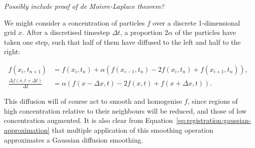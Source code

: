 	  \emph{Possibly include proof of de Moivre-Laplace theorem?}
  
	  We might consider a concentration of particles $f$ over a discrete 1-dimensional grid $x$. After a discretised timestep $\Delta t$, a proportion $2\alpha$ of the particles have taken one step, such that half of them have diffused to the left and half to the right:
  	
	  \begin{align}
	    f(x_i, t_{n+1}) &= f(x_i, t_n) + \alpha (f(x_{i-1}, t_n) - 2f(x_i, t_n) + f(x_{i+1}, t_n)), \label{eqn:diffusion_1d} \\
	    \frac{\Delta f(x, t + \Delta t)}{\Delta t} &= \alpha (f(x - \Delta x, t) - 2f(x, t) + f(x + \Delta x, t)).
		\end{align}
  	
	  This diffusion will of course act to smooth and homogenise $f$, since regions of high concentration relative to their neighbours will be reduced, and those of low concentration augmented. It is also clear from Equation~\ref{eq:registration:gaussian-approximation} that multiple application of this smoothing operation approximates a Gaussian diffusion smoothing.
		
	
